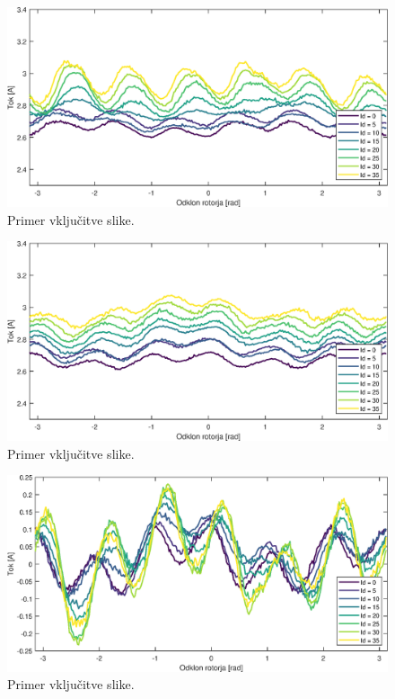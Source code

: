 \documentclass[a4paper,twoside,openright,12pt,slovene]{book}
\begin{document}
\begin{figure}[!htbp]
    \centering
    \includegraphics[width=1\columnwidth]{Slike/tokovniOdzivIs_HKSslediRKS_IdAmp.eps}
    \caption{\label{tokovniOdzivIs_HKSslediRKS_IdAmp} Primer vključitve slike.}
\end{figure}

\begin{figure}[!htbp]
    \centering
    \includegraphics[width=1\columnwidth]{Slike/tokovniOdzivIs_HKSslediRKS_IqAmp.eps}
    \caption{\label{tokovniOdzivIs_HKSslediRKS_IqAmp} Primer vključitve slike.}
\end{figure}

\begin{figure}[!htbp]
    \centering
    \includegraphics[width=1\columnwidth]{Slike/tokovniOdzivIs_HKSslediRKS_diff.eps}
    \caption{\label{tokovniOdzivIs_HKSslediRKS_diff} Primer vključitve slike.}
\end{figure}
\end{document}
